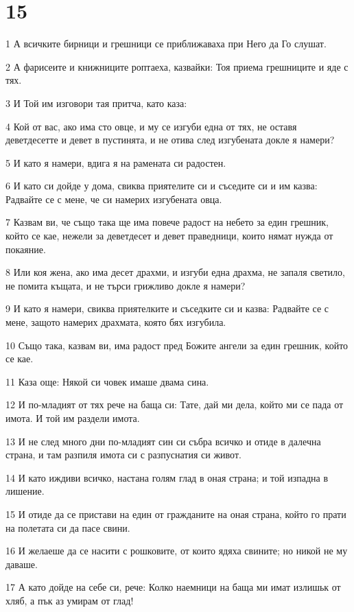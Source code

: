\chapter{15}

\par 1 А всичките бирници и грешници се приближаваха при Него да Го слушат.
\par 2 А фарисеите и книжниците роптаеха, казвайки: Тоя приема грешниците и яде с тях.
\par 3 И Той им изговори тая притча, като каза:
\par 4 Кой от вас, ако има сто овце, и му се изгуби една от тях, не оставя деветдесетте и девет в пустинята, и не отива след изгубената докле я намери?
\par 5 И като я намери, вдига я на рамената си радостен.
\par 6 И като си дойде у дома, свиква приятелите си и съседите си и им казва: Радвайте се с мене, че си намерих изгубената овца.
\par 7 Казвам ви, че също така ще има повече радост на небето за един грешник, който се кае, нежели за деветдесет и девет праведници, които нямат нужда от покаяние.
\par 8 Или коя жена, ако има десет драхми, и изгуби една драхма, не запаля светило, не помита къщата, и не търси грижливо докле я намери?
\par 9 И като я намери, свиква приятелките и съседките си и казва: Радвайте се с мене, защото намерих драхмата, която бях изгубила.
\par 10 Също така, казвам ви, има радост пред Божите ангели за един грешник, който се кае.
\par 11 Каза още: Някой си човек имаше двама сина.
\par 12 И по-младият от тях рече на баща си: Тате, дай ми дела, който ми се пада от имота. И той им раздели имота.
\par 13 И не след много дни по-младият син си събра всичко и отиде в далечна страна, и там разпиля имота си с разпуснатия си живот.
\par 14 И като иждиви всичко, настана голям глад в оная страна; и той изпадна в лишение.
\par 15 И отиде да се пристави на един от гражданите на оная страна, който го прати на полетата си да пасе свини.
\par 16 И желаеше да се насити с рошковите, от които ядяха свините; но никой не му даваше.
\par 17 А като дойде на себе си, рече: Колко наемници на баща ми имат излишьк от хляб, а пък аз умирам от глад!
